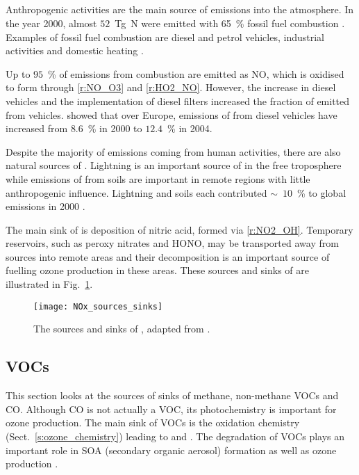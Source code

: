 \subsection[NOx]{}
Anthropogenic activities are the main source of  emissions into the atmosphere.
In the year 2000, almost $52$~Tg~N were emitted with 65~\% fossil fuel combustion \citep{Seinfeld:2006}. 
Examples of fossil fuel combustion are diesel and petrol vehicles, industrial activities and domestic heating \citep{vonSchneidemesser:2015}.

Up to $95$~\% of  emissions from combustion are emitted as NO, which is oxidised to form  through \eqref{r:NO_O3} and \eqref{r:HO2_NO}.
However, the increase in diesel vehicles and the implementation of diesel filters increased the fraction of emitted  from vehicles.
\citet{Grice:2009} showed that over Europe, emissions of  from diesel vehicles have increased from $8.6$~\% in 2000 to $12.4$~\% in 2004.

Despite the majority of  emissions coming from human activities, there are also natural sources of .
Lightning is an important source of  in the free troposphere while emissions of  from soils are important in remote regions with little anthropogenic influence.
Lightning and soils each contributed $\sim$~$10$~\% to global  emissions in 2000 \citep{Seinfeld:2006}.

The main sink of  is deposition of nitric acid, formed via \eqref{r:NO2_OH}.
Temporary reservoirs, such as peroxy nitrates and HONO, may be transported away from sources into remote areas and their decomposition is an important source of  fuelling ozone production in these areas.
These sources and sinks of  are illustrated in Fig.~\ref{f:NOx_sources_sinks}.
\begin{figure}[t]%
	\begin{center}%
        \caption[ sources and sinks]{The sources and sinks of , adapted from \citet{Seinfeld:2006}.}%
        \texttt{[image: NOx\_sources\_sinks]}%
        \label{f:NOx_sources_sinks}%
	\end{center}%
\end{figure}%

\subsection{VOCs}
This section looks at the sources of sinks of methane, non-methane VOCs and CO.
Although CO is not actually a VOC, its photochemistry is important for ozone production.
The main sink of VOCs is the oxidation chemistry (Sect.~\ref{s:ozone_chemistry}) leading to  and .
The degradation of VOCs plays an important role in SOA (secondary organic aerosol) formation as well as ozone production \citep{Hallquist:2009}.

